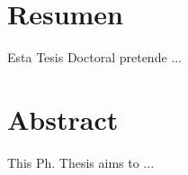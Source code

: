 \begingroup
\let\clearpage\relax
\let\cleardoublepage\relax
\let\cleardoublepage\relax

\chapter*{Resumen}
Esta Tesis Doctoral pretende ...


\vfill

\chapter*{Abstract}
This Ph. Thesis aims to ...


\endgroup

\vfill